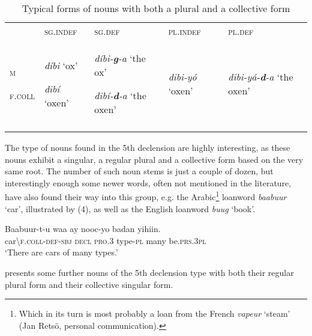 \documentclass[output=paper]{langsci/langscibook}
\begin{document}
\begin{table}
\caption{Typical forms of nouns with both a plural and a collective form}
\label{tab:9}

\begin{tabularx}{\textwidth}{XXXXX} & {\textsc{sg.indef}} & {\textsc{sg.def}} & {\textsc{pl.indef}} & {\textsc{pl.def}}\\
\lsptoprule
{\textsc{m}}

{\textsc{f.coll}} & {\textit{díbi  }‘ox’}

{\textit{dibí  }‘oxen’} & {\textit{díbi-}\textbf{\textit{g}}\textit{{}-a  }‘the ox’ }

{\textit{dibí-}\textbf{\textit{d}}\textit{{}-a  }‘the oxen’} & {\textit{dibi-yó  }‘oxen’} & {\textit{dibi-yá-}\textbf{\textit{d}}\textit{{}-a  }‘the oxen’}\\
\lspbottomrule
\end{tabularx}

\end{table} 


The type of nouns found in the 5th declension are highly interesting, as these nouns exhibit a singular, a regular plural and a collective form based on the very same root. The number of such noun stems is just a couple of dozen, but interestingly enough some newer words, often not mentioned in the literature, have also found their way into this group, e.g. the Arabic\footnote{Which in its turn is most probably a loan from the French \textit{vapeur} ‘steam’ (Jan Retsö, personal communication).} loanword \textit{baabuur} ‘car’, illustrated by (4), as well as the English loanword \textit{buug} ‘book’.

\ea
\gll Baabuur-t-u     waa    ay    nooc-yo  badan   yihiin.\\
     car{\textbackslash}\textsc{f.coll-def-sbj  decl    pro.3  }type-\textsc{pl}  many   be.\textsc{prs.3pl}\\
\glt ‘There are cars of many types.’
\z

 presents some further nouns of the 5th declension type with both their regular plural form and their collective singular form.
 
\end{document}
